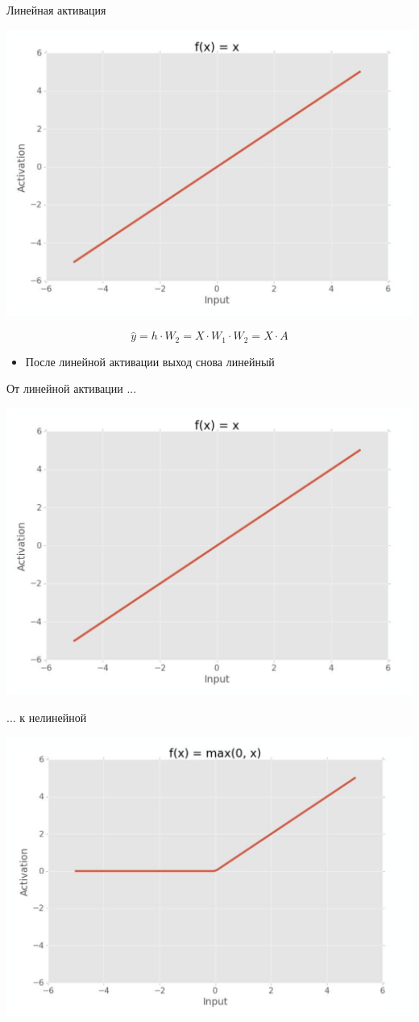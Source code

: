\documentclass[notes,12pt, aspectratio=169]{beamer}
\begin{document}
\begin{frame}{Линейная активация}
\begin{center}
	\includegraphics[width=.4\linewidth]{linear_activation.png}
\end{center}

\[ \hat y = h \cdot W_2 = X \cdot W_1 \cdot W_2 = X \cdot A \]

\begin{itemize}
	\item  После линейной активации выход снова линейный
\end{itemize}
\end{frame}


\begin{frame}{От линейной активации ... }
\begin{center}
	\includegraphics[width=.7\linewidth]{linear_activation.png}
\end{center}
\end{frame}


\begin{frame}{... к нелинейной}
\begin{center}
	\includegraphics[width=.7\linewidth]{nonlinear_activation.png}
\end{center}
\end{frame}
\end{document}
